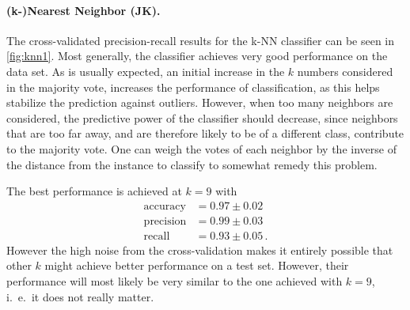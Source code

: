 \documentclass[12pt, a4paper]{scrartcl}
\begin{document}
\paragraph{(k-)Nearest Neighbor (JK).} The cross-validated precision-recall results for the k-NN classifier can be seen in \cref{fig:knn1}. Most generally, the classifier achieves very good performance on the data set.
As is usually expected, an initial increase in the $k$ numbers considered in the majority vote, increases the performance of classification, as this helps stabilize the prediction against outliers. However, when too many neighbors are considered, the predictive power of the classifier should decrease, since neighbors that are too far away, and are therefore likely to be of a different class, contribute to the majority vote. One can weigh the votes of each neighbor by the inverse of the distance from the instance to classify to somewhat remedy this problem.

The best performance is achieved at $k=9$ with 
\begin{align*}
	\text{accuracy} &= 0.97 \pm 0.02 \\
	\text{precision} &= 0.99 \pm 0.03 \\
	\text{recall} &= 0.93 \pm 0.05 \, .
\end{align*}
However the high noise from the cross-validation makes it entirely possible that other $k$ might achieve better performance on a test set. However, their performance will most likely be very similar to the one achieved with $k=9$, i.\ e.\ it does not really matter.
\end{document}

